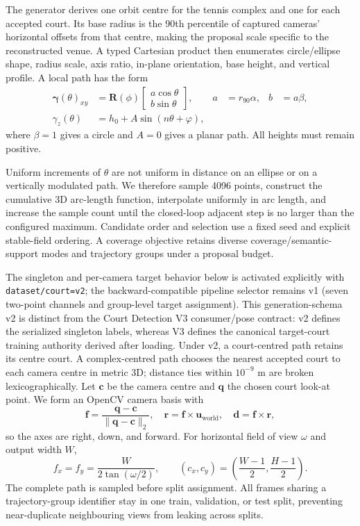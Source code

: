 The generator derives one orbit centre for the tennis complex and one for each
accepted court.  Its base radius is the 90th percentile of captured cameras'
horizontal offsets from that centre, making the proposal scale specific to the
reconstructed venue.  A typed Cartesian product then enumerates circle/ellipse
shape, radius scale, axis ratio, in-plane orientation, base height, and vertical
profile.  A local path has the form
\begin{align}
  \bm{\gamma}(\theta)_{xy}
    &=\mathbf{R}(\phi)
      \begin{bmatrix}a\cos\theta\\b\sin\theta\end{bmatrix},
      &a&=r_{90}\alpha, &b&=a\beta, \\
  \gamma_z(\theta)
    &=h_0+A\sin(n\theta+\varphi),
  \label{eq:trajectory}
\end{align}
where \(\beta=1\) gives a circle and \(A=0\) gives a planar path.  All heights
must remain positive.

Uniform increments of \(\theta\) are not uniform in distance on an ellipse or
on a vertically modulated path.  We therefore sample 4096 points, construct the
cumulative 3D arc-length function, interpolate uniformly in arc length, and
increase the sample count until the closed-loop adjacent step is no larger than
the configured maximum.  Candidate order and selection use a fixed seed and
explicit stable-field ordering.  A coverage objective retains diverse
coverage/semantic-support modes and trajectory groups under a proposal budget.

The singleton and per-camera target behavior below is activated explicitly with
\texttt{dataset/court=v2}; the backward-compatible pipeline selector remains
v1 (seven two-point channels and group-level target assignment).  This
generation-schema v2 is distinct from the Court Detection V3 consumer/pose
contract: v2 defines the serialized singleton labels, whereas V3 defines the
canonical target-court training authority derived after loading.  Under v2, a
court-centred path retains its centre court.  A complex-centred path chooses the nearest accepted court to
each camera centre in metric 3D; distance ties within \(10^{-9}\) m are broken
lexicographically.  Let \(\mathbf{c}\) be the camera centre and \(\mathbf{q}\)
the chosen court look-at point.  We form an OpenCV camera basis with
\begin{equation}
  \mathbf{f}=\frac{\mathbf{q}-\mathbf{c}}{\|\mathbf{q}-\mathbf{c}\|_2},\quad
  \mathbf{r}=\mathbf{f}\times\mathbf{u}_{\mathrm{world}},\quad
  \mathbf{d}=\mathbf{f}\times\mathbf{r},
  \label{eq:lookat}
\end{equation}
so the axes are right, down, and forward.  For horizontal field of view
\(\omega\) and output width \(W\),
\begin{equation}
  f_x=f_y=\frac{W}{2\tan(\omega/2)},\qquad
  (c_x,c_y)=\left(\frac{W-1}{2},\frac{H-1}{2}\right).
  \label{eq:intrinsics}
\end{equation}
The complete path is sampled before split assignment.  All frames sharing a
trajectory-group identifier stay in one train, validation, or test split,
preventing near-duplicate neighbouring views from leaking across splits.

